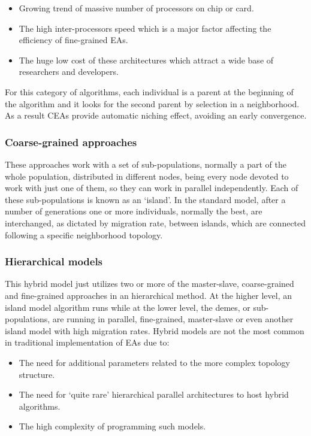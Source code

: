 \documentclass{article}
\begin{document}
\begin{itemize}
\item Growing trend of massive number of processors on chip or card. 
\item The high inter-processors speed which is a major factor affecting the efficiency of fine-grained EAs. 
\item The huge low cost of these architectures which attract a wide base of researchers and developers. 
\end{itemize}

For this category of algorithms, each individual is a parent at the beginning of the algorithm and it looks for the second parent by selection in a neighborhood. As a result CEAs provide automatic niching effect, avoiding an early convergence. 

\subsubsection{Coarse-grained approaches}
\label{subsec:coarsegrainedapproaches}
These approaches work with a set of sub-populations, normally a part
of the whole population, distributed in different nodes, being every
node devoted to work with just one of them, so they can work in
parallel independently. Each of these sub-populations is known as an
`island'. In the standard model, after a number of generations one or
more individuals, normally the best, are interchanged, as dictated by
migration rate, between islands, which are connected following a
specific neighborhood topology. 


\subsubsection{Hierarchical models}
This hybrid model just utilizes two or more of the master-slave, coarse-grained and fine-grained approaches in an hierarchical method. At the higher level, an island model algorithm runs while at the lower level, the demes, or sub-populations, are running in parallel, fine-grained, master-slave or even another island model with high migration rates. Hybrid models are not the most common in traditional implementation of EAs due to:
\begin{itemize}
 \item The need for additional parameters related to the more complex topology structure. 
 \item The need for `quite rare' hierarchical parallel architectures to host hybrid algorithms. 
\item The high complexity of programming such models. 
\end{itemize}
\end{document}
